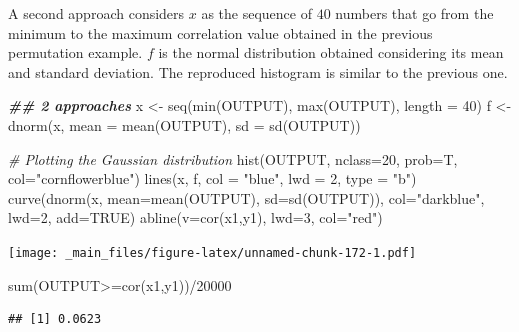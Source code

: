 \documentclass[
  notitlepage,
  onecolumn,
  openany]{book}
\newenvironment{Shaded}{\begin{snugshade}}{\end{snugshade}}
\newcommand{\AttributeTok}[1]{\textcolor[rgb]{0.77,0.63,0.00}{#1}}
\newcommand{\CommentTok}[1]{\textcolor[rgb]{0.56,0.35,0.01}{\textit{#1}}}
\newcommand{\ConstantTok}[1]{\textcolor[rgb]{0.00,0.00,0.00}{#1}}
\newcommand{\DecValTok}[1]{\textcolor[rgb]{0.00,0.00,0.81}{#1}}
\newcommand{\DocumentationTok}[1]{\textcolor[rgb]{0.56,0.35,0.01}{\textbf{\textit{#1}}}}
\newcommand{\FunctionTok}[1]{\textcolor[rgb]{0.00,0.00,0.00}{#1}}
\newcommand{\NormalTok}[1]{#1}
\newcommand{\OtherTok}[1]{\textcolor[rgb]{0.56,0.35,0.01}{#1}}
\newcommand{\SpecialCharTok}[1]{\textcolor[rgb]{0.00,0.00,0.00}{#1}}
\newcommand{\StringTok}[1]{\textcolor[rgb]{0.31,0.60,0.02}{#1}}
\begin{document}
A second approach considers \(x\) as the sequence of \(40\) numbers that go from the minimum to the maximum correlation value obtained in the previous permutation example. \(f\) is the normal distribution obtained considering its mean and standard deviation. The reproduced histogram is similar to the previous one.

\begin{Shaded}
\begin{Highlighting}[]
\DocumentationTok{\#\# 2 approaches}
\NormalTok{x }\OtherTok{\textless{}{-}} \FunctionTok{seq}\NormalTok{(}\FunctionTok{min}\NormalTok{(OUTPUT), }\FunctionTok{max}\NormalTok{(OUTPUT), }\AttributeTok{length =} \DecValTok{40}\NormalTok{)}
\NormalTok{f }\OtherTok{\textless{}{-}} \FunctionTok{dnorm}\NormalTok{(x, }\AttributeTok{mean =} \FunctionTok{mean}\NormalTok{(OUTPUT), }\AttributeTok{sd =} \FunctionTok{sd}\NormalTok{(OUTPUT))}

\CommentTok{\# Plotting the Gaussian distribution}
\FunctionTok{hist}\NormalTok{(OUTPUT, }\AttributeTok{nclass=}\DecValTok{20}\NormalTok{, }\AttributeTok{prob=}\NormalTok{T, }\AttributeTok{col=}\StringTok{"cornflowerblue"}\NormalTok{)}
\FunctionTok{lines}\NormalTok{(x, f, }\AttributeTok{col =} \StringTok{"blue"}\NormalTok{, }\AttributeTok{lwd =} \DecValTok{2}\NormalTok{, }\AttributeTok{type =} \StringTok{"b"}\NormalTok{)}
\FunctionTok{curve}\NormalTok{(}\FunctionTok{dnorm}\NormalTok{(x, }\AttributeTok{mean=}\FunctionTok{mean}\NormalTok{(OUTPUT), }\AttributeTok{sd=}\FunctionTok{sd}\NormalTok{(OUTPUT)), }
      \AttributeTok{col=}\StringTok{"darkblue"}\NormalTok{, }\AttributeTok{lwd=}\DecValTok{2}\NormalTok{, }\AttributeTok{add=}\ConstantTok{TRUE}\NormalTok{)}
\FunctionTok{abline}\NormalTok{(}\AttributeTok{v=}\FunctionTok{cor}\NormalTok{(x1,y1), }\AttributeTok{lwd=}\DecValTok{3}\NormalTok{, }\AttributeTok{col=}\StringTok{"red"}\NormalTok{)}
\end{Highlighting}
\end{Shaded}

\texttt{[image: \_main\_files/figure-latex/unnamed-chunk-172-1.pdf]}

\begin{Shaded}
\begin{Highlighting}[]
\FunctionTok{sum}\NormalTok{(OUTPUT}\SpecialCharTok{\textgreater{}=}\FunctionTok{cor}\NormalTok{(x1,y1))}\SpecialCharTok{/}\DecValTok{20000}
\end{Highlighting}
\end{Shaded}

\begin{verbatim}
## [1] 0.0623
\end{verbatim}
\end{document}
